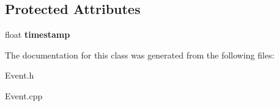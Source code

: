 \subsection*{\-Protected \-Attributes}
\begin{DoxyCompactItemize}
\item 
\hypertarget{classEvent_a7ceeca46ae28fce79241258b78c383de}{float {\bfseries timestamp}}\label{classEvent_a7ceeca46ae28fce79241258b78c383de}

\end{DoxyCompactItemize}


\-The documentation for this class was generated from the following files\-:\begin{DoxyCompactItemize}
\item 
\-Event.\-h\item 
\-Event.\-cpp\end{DoxyCompactItemize}

